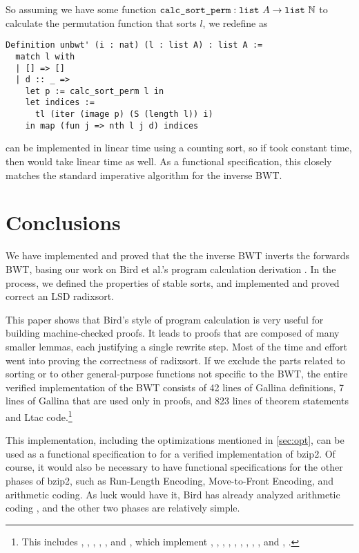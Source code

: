 \documentclass[sigplan,10pt,anonymous,review]{thesis}
\begin{document}
So assuming we have some function $\texttt{\textup{calc\_sort\_perm}} :
\texttt{\textup{list}}~A \to \texttt{\textup{list}}~\mathbb{N}$ to calculate the permutation
function that sorts $l$, we redefine  as
\begin{lstlisting}
Definition unbwt' (i : nat) (l : list A) : list A :=
  match l with
  | [] => []
  | d :: _ =>
    let p := calc_sort_perm l in
    let indices :=
      tl (iter (image p) (S (length l)) i)
    in map (fun j => nth l j d) indices
\end{lstlisting}
 can be implemented in linear time using a
counting sort, so if  took constant time, then 
would take linear time as well. As a functional specification, this
closely matches the standard imperative algorithm for the inverse BWT.

\section{Conclusions}
We have implemented and proved that the the inverse BWT inverts the
forwards BWT, basing our work on Bird et al.'s program calculation
derivation \cite{birdmu,pearls}. In the process, we defined the
properties of stable sorts, and implemented and proved correct an LSD
radixsort.

This paper shows that Bird's style of program calculation is very
useful for building machine-checked proofs. It leads to proofs that
are composed of many smaller lemmas, each justifying a single rewrite
step. Most of the time and effort went into proving the correctness of
radixsort. If we exclude the parts related to sorting or to other
general-purpose functions not specific to the BWT, the entire verified
implementation of the BWT consists of 42 lines of Gallina definitions,
7 lines of Gallina that are used only in proofs, and 823 lines of
theorem statements and Ltac code.\footnote{This includes
  , , ,
  , ,  and
  , which implement , ,
  , , , , ,
  , , and , .}

This implementation, including the optimizations mentioned in
\cref{sec:opt}, can be used as a functional specification to for a
verified implementation of bzip2. Of course, it would also be
necessary to have functional specifications for the other phases of
bzip2, such as Run-Length Encoding, Move-to-Front Encoding, and
arithmetic coding. As luck would have it, Bird has already analyzed
arithmetic coding \cite{pearls}, and the other two phases are
relatively simple.
\end{document}
